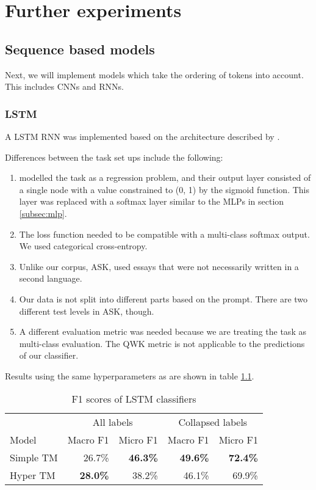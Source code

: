 \chapter{Further experiments}

\section{Sequence based models}

Next, we will implement models which take the ordering of tokens into account.
This includes \acp{CNN} and \acp{RNN}. 

\subsection{LSTM}

A \ac{LSTM} \ac{RNN} was implemented based on the architecture described
by \textcite{taghipour16}.

Differences between the task set ups include the following:

\begin{enumerate}
    \item \citeauthor{taghipour16} modelled the task as a regression problem,
        and their output layer consisted of a single node with a value constrained
        to (0, 1) by the sigmoid function. This layer was replaced with a softmax
        layer similar to the \acp{MLP} in section \ref{subsec:mlp}.
    \item The loss function needed to be compatible with a multi-class softmax
        output. We used categorical cross-entropy.
    \item Unlike our corpus, ASK, \citeauthor{taghipour16} used essays that were
        not necessarily written in a second language.
    \item Our data is not split into different parts based on the prompt. There
        are two different test levels in ASK, though.
    \item A different evaluation metric was needed because we are treating the task
        as multi-class evaluation. The \ac{QWK} metric is not applicable to
        the predictions of our classifier.
\end{enumerate}

Results using the same hyperparameters as \citeauthor{taghipour16} are shown
in table \ref{lstm-results}.

\begin{table}
  \centering
  \begin{tabular}{|l|rr|rr|}
    \toprule
             & \multicolumn{2}{c|}{All labels} & \multicolumn{2}{c|}{Collapsed labels} \\
    Model      & Macro F1        & Micro F1        & Macro F1        & Micro F1        \\
    \midrule
    Simple TM  &         26.7\%  & \textbf{46.3\%} & \textbf{49.6\%} & \textbf{72.4\%} \\
    Hyper TM   & \textbf{28.0\%} &         38.2\%  &         46.1\%  &         69.9\%  \\
    \bottomrule
  \end{tabular}
  \caption{F1 scores of LSTM classifiers}
  \label{lstm-results}
\end{table}
